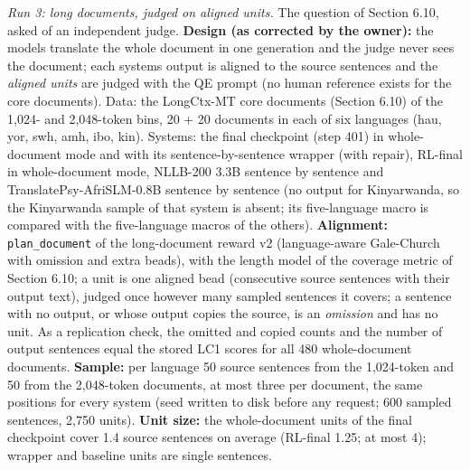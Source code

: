 \emph{Run 3: long documents, judged on aligned units.} The question of Section 6.10, asked of an independent judge. \textbf{Design (as corrected by the owner):} the models translate the whole document in one generation and the judge never sees the document; each system\textquotesingle s output is aligned to the source sentences and the \emph{aligned units} are judged with the QE prompt (no human reference exists for the core documents). Data: the LongCtx-MT core documents (Section 6.10) of the 1,024- and 2,048-token bins, 20 + 20 documents in each of six languages (hau, yor, swh, amh, ibo, kin). Systems: the final checkpoint (step 401) in whole-document mode and with its sentence-by-sentence wrapper (with repair), RL-final in whole-document mode, NLLB-200 3.3B sentence by sentence and TranslatePsy-AfriSLM-0.8B sentence by sentence (no output for Kinyarwanda, so the Kinyarwanda sample of that system is absent; its five-language macro is compared with the five-language macros of the others). \textbf{Alignment:} \texttt{plan\_document} of the long-document reward v2 (language-aware Gale-Church with omission and extra beads), with the length model of the coverage metric of Section 6.10; a unit is one aligned bead (consecutive source sentences with their output text), judged once however many sampled sentences it covers; a sentence with no output, or whose output copies the source, is an \emph{omission} and has no unit. As a replication check, the omitted and copied counts and the number of output sentences equal the stored LC1 scores for all 480 whole-document documents. \textbf{Sample:} per language 50 source sentences from the 1,024-token and 50 from the 2,048-token documents, at most three per document, the same positions for every system (seed written to disk before any request; 600 sampled sentences, 2,750 units). \textbf{Unit size:} the whole-document units of the final checkpoint cover 1.4 source sentences on average (RL-final 1.25; at most 4); wrapper and baseline units are single sentences.

